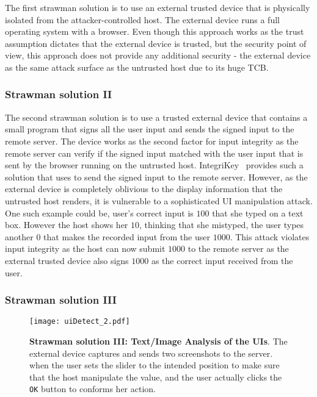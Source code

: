 The first strawman solution is to use an external trusted device that is physically isolated from the attacker-controlled host. The external device runs a full operating system with a browser. Even though this approach works as the trust assumption dictates that the external device is trusted, but the security point of view, this approach does not provide any additional security - the external device as the same attack surface as the untrusted host due to its huge TCB.

\subsubsection{\bfseries Strawman solution II}
\label{sec:approach:strawman:2}

The second strawman solution is to use a trusted external device that contains a small program that signs all the user input and sends the signed input to the remote server. The device works as the second factor for input integrity as the remote server can verify if the signed input matched with the user input that is sent by the browser running on the untrusted host. IntegriKey~\cite{IntegriKey} provides such a solution that uses \webusb to send the signed input to the remote server. However, as the external device is completely oblivious to the display information that the untrusted host renders, it is vulnerable to a sophisticated UI manipulation attack. One such example could be, user's correct input is $100$ that she typed on a text box. However the host shows her $10$, thinking that she mistyped, the user types another $0$ that makes the recorded input from the user $1000$. This attack violates input integrity as the host can now submit $1000$ to the remote server as the external trusted device also signs $1000$ as the correct input received from the user.  

\subsubsection{\bfseries Strawman solution III}
\label{sec:approach:strawman:3}

\begin{figure}[t]
\centering
\texttt{[image: uiDetect\_2.pdf]}
\caption{\textbf{Strawman solution III: Text/Image Analysis of the UIs}. The external device captures and sends two screenshots to the server. \one when the user sets the slider to the intended position to make sure that the host manipulate the value, and \two the user actually clicks the \texttt{OK} button to conforms her action.}
\label{fig:uiDetect}
\centering
\end{figure}

